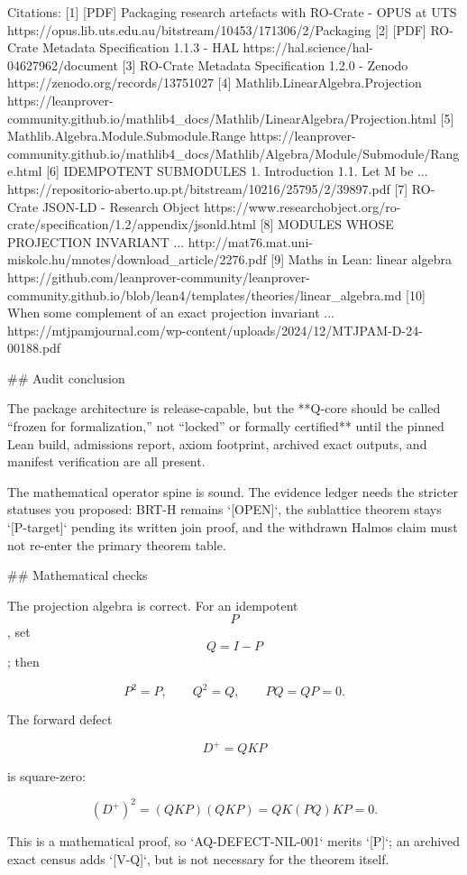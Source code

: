 Citations:
[1] [PDF] Packaging research artefacts with RO-Crate - OPUS at UTS https://opus.lib.uts.edu.au/bitstream/10453/171306/2/Packaging%
[2] [PDF] RO-Crate Metadata Specification 1.1.3 - HAL https://hal.science/hal-04627962/document
[3] RO-Crate Metadata Specification 1.2.0 - Zenodo https://zenodo.org/records/13751027
[4] Mathlib.LinearAlgebra.Projection https://leanprover-community.github.io/mathlib4_docs/Mathlib/LinearAlgebra/Projection.html
[5] Mathlib.Algebra.Module.Submodule.Range https://leanprover-community.github.io/mathlib4_docs/Mathlib/Algebra/Module/Submodule/Range.html
[6] IDEMPOTENT SUBMODULES 1. Introduction 1.1. Let M be ... https://repositorio-aberto.up.pt/bitstream/10216/25795/2/39897.pdf
[7] RO-Crate JSON-LD - Research Object https://www.researchobject.org/ro-crate/specification/1.2/appendix/jsonld.html
[8] MODULES WHOSE PROJECTION INVARIANT ... http://mat76.mat.uni-miskolc.hu/mnotes/download_article/2276.pdf
[9] Maths in Lean: linear algebra https://github.com/leanprover-community/leanprover-community.github.io/blob/lean4/templates/theories/linear_algebra.md
[10] When some complement of an exact projection invariant ... https://mtjpamjournal.com/wp-content/uploads/2024/12/MTJPAM-D-24-00188.pdf

## Audit conclusion

The package architecture is release-capable, but the **Q-core should be called “frozen for formalization,” not “locked” or formally certified** until the pinned Lean build, admissions report, axiom footprint, archived exact outputs, and manifest verification are all present.

The mathematical operator spine is sound. The evidence ledger needs the stricter statuses you proposed: BRT-H remains `[OPEN]`, the sublattice theorem stays `[P-target]` pending its written join proof, and the withdrawn Halmos claim must not re-enter the primary theorem table.

## Mathematical checks

The projection algebra is correct. For an idempotent $$P$$, set $$Q=I-P$$; then

$$
P^2=P,\qquad Q^2=Q,\qquad PQ=QP=0.
$$

The forward defect

$$
D^+=QKP
$$

is square-zero:

$$
(D^+)^2
=
(QKP)(QKP)
=
QK(PQ)KP
=
0.
$$

This is a mathematical proof, so `AQ-DEFECT-NIL-001` merits `[P]`; an archived exact census adds `[V-Q]`, but is not necessary for the theorem itself.

